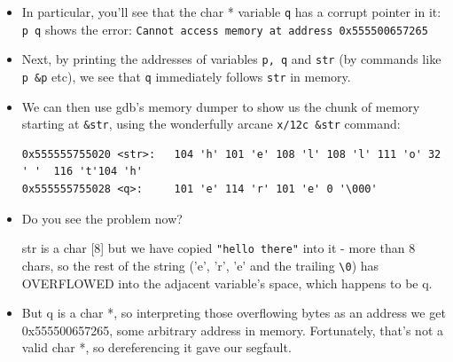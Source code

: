 \documentclass[aspectratio=169]{beamer}
\newcommand{\pitem}{\pause \item}
\begin{document}
\begin{frame}[fragile]
    \begin{itemize}
      \item
      In particular, you'll see that the char * variable \verb+q+ has a corrupt pointer in it:
        \verb'p q' shows the error:
	\verb+Cannot access memory at address 0x555500657265+

      \pitem
      Next, by printing the addresses of variables \verb+p, q+ and \verb+str+
      (by commands like \verb+p &p+ etc), we see that \verb+q+
      \alert{immediately follows} \verb+str+ in memory.

      \pitem
      We can then use gdb's \alert{memory dumper} to show us the chunk of memory
      starting at \verb+&str+, using the wonderfully arcane \verb+x/12c &str+ command:

	{\tiny
	\begin{verbatim}
0x555555755020 <str>:   104 'h' 101 'e' 108 'l' 108 'l' 111 'o' 32 ' '  116 't'104 'h'
0x555555755028 <q>:     101 'e' 114 'r' 101 'e' 0 '\000'
	\end{verbatim}
	}

      \item
      Do you see the problem now?

      \pause
      str is a \alert{char [8]} but we have copied \verb+"hello there"+
      into it - more than 8 chars,
      \pause
      so the rest of the string
      ('e', 'r', 'e' and the trailing \verb+\0+)
      has OVERFLOWED into the adjacent variable's space, which happens to be
      \alert{q}.

      \pitem
      But q is a char *, so interpreting those overflowing bytes as an address we get
      0x555500657265, some arbitrary address in memory.
      Fortunately, that's not a valid char *, so dereferencing it gave our segfault.

    \end{itemize}
\end{frame}
\end{document}
